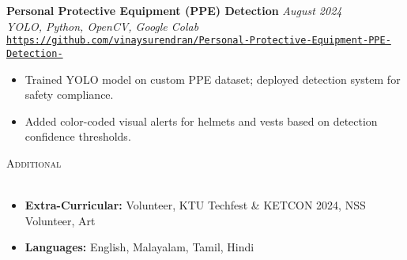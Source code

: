 \documentclass[letterpaper]{article}
\newcommand{\lineunder} {
    \vspace*{-8pt} \\
    \hspace*{-18pt} \hrulefill \\
}
\newcommand{\header} [1] {
    {\hspace*{-18pt}\vspace*{6pt} \textsc{#1}}
    \vspace*{-6pt} \lineunder
}
\begin{document}
    \textbf{Personal Protective Equipment (PPE) Detection} \hfill \textsl{August 2024} \\
    \textsl{YOLO, Python, OpenCV, Google Colab} \\ \texttt{\href{https://github.com/vinaysurendran/Personal-Protective-Equipment-PPE-Detection-}{https://github.com/vinaysurendran/Personal-Protective-Equipment-PPE-Detection-}} \\
    \vspace{-2mm}
    \begin{itemize} \itemsep -1mm
        \item Trained YOLO model on custom PPE dataset; deployed detection system for safety compliance.
        \item Added color-coded visual alerts for helmets and vests based on detection confidence thresholds.
    \end{itemize}
    \vspace{-1mm}

\header{Additional}
\vspace{1mm}

    \begin{itemize} \itemsep -1mm
        \item \textbf{Extra-Curricular:} Volunteer, KTU Techfest \& KETCON 2024, NSS Volunteer, Art
        \item \textbf{Languages:} English, Malayalam, Tamil, Hindi
    \end{itemize}
    \vspace{-2mm}
\end{document}
